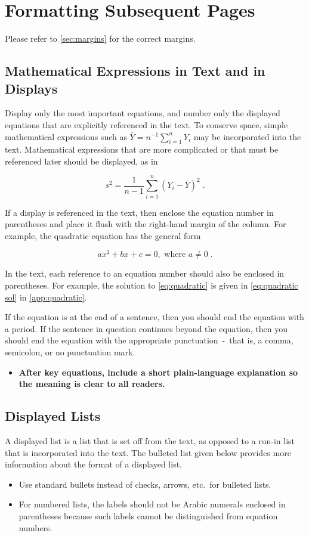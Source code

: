 \documentclass{scspaperproc}
\theoremstyle{scsthe}
\begin{document}
\section{Formatting Subsequent Pages}
Please refer to \autoref{sec:margins} for the correct margins.

\subsection{Mathematical Expressions in Text and in Displays}
Display only the most important equations, and number only the displayed equations that are explicitly referenced in the text. To conserve space, simple mathematical expressions such as \mbox{$\bar Y = n^{-1} \sum_{i=1}^n Y_i$} may be incorporated into the text. Mathematical expressions that are more complicated or that must be referenced later should be displayed, as in

\begin{equation}
s^2 = \frac 1 {n-1} \sum_{i=1}^n (Y_i - \bar Y)^2\;. \nonumber
\end{equation}

If a display is referenced in the text, then enclose the equation number in parentheses and place it flush with the right-hand margin of the column. For example, the quadratic equation has the general form

\begin{equation} \label{eq:quadratic}
ax^2 + bx + c = 0, \mbox{ where } a \ne 0\;.
\end{equation}

In the text, each reference to an equation number should also be enclosed in parentheses. For example, the solution to \eqref{eq:quadratic} is given in \eqref{eq:quadratic sol} in \autoref{app:quadratic}.

If the equation is at the end of a sentence, then you should end the equation with a period. If the sentence in question continues beyond the equation, then you should end the equation with the appropriate punctuation~-~that is, a comma, semicolon, or no punctuation mark.

\begin{itemize}
  \item \textbf{ After key equations, include a short plain-language explanation so the meaning is clear to all readers.}
\end{itemize}


\subsection{Displayed Lists}
A displayed list is a list that is set off from the text, as opposed to a run-in list that is incorporated into the text. The bulleted list given below provides more information about the format of a displayed list. 
\begin{itemize}
	\item Use standard bullets instead of checks, arrows, etc.\ for bulleted lists.
	\item For numbered lists, the labels should not be Arabic numerals enclosed in parentheses because such labels cannot be distinguished from equation numbers.
\end{itemize}
\end{document}
